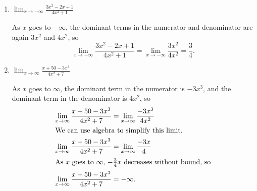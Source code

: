 \documentclass{article}
\begin{document}
\begin{enumerate}
\begin{enumerate}

    \begin{problem}[\vfill]
      $\displaystyle \lim_{x \to \infty} \frac{3x^2 - 2x + 1}{4x^2 + 1}$      
    \end{problem}

    \begin{solution}
      Using the idea of the previous part, we can identify that, as $x$ goes to $\infty$,
      the dominant term in the numerator is $3x^2$, 
      and the dominant term in the denominator is $4x^2$. This means that
      \begin{align*}
        \lim_{x \to \infty} \frac{3x^2-2x+1}{4x^2+1} &= \lim_{x \to \infty} \frac{3x^2}{4x^2}.\\
        \intertext{We can simplify this using algebra and evaluate the limit.}
        \lim_{x \to \infty} \frac{3x^2-2x+1}{4x^2+1} &= \frac{3}{4}
      \end{align*}
    \end{solution}

  \item

    \begin{problem}[\vfill]
      $\displaystyle \lim_{x \to -\infty} \frac{3x^2 - 2x + 1}{4x^2 + 1}$      
    \end{problem}

    \begin{solution}
      As $x$ goes to $-\infty$, the dominant terms in the numerator and denominator are again $3x^2$ and $4x^2$,
      so
      \[\lim_{x \to -\infty} \frac{3x^2-2x+1}{4x^2+1} = \lim_{x \to -\infty} \frac{3x^2}{4x^2}=\frac{3}{4}.\]
    \end{solution}

  \item
    \begin{problem}[\vfill]
      $\displaystyle \lim_{x \to \infty} \frac{x + 50 - 3x^3}{4x^2 + 7}$      
    \end{problem}

    \begin{solution}
      As $x$ goes to $\infty$, the dominant term in the numerator is $-3x^3$, and the dominant term in the
      denominator is $4x^2$, so
      \begin{align*}
        \lim_{x \to \infty} \frac{x + 50 - 3x^3}{4x^2 + 7} &= \lim_{x \to \infty} \frac{-3x^3}{4x^2} \\
        \intertext{We can use algebra to simplify this limit.}
        \lim_{x \to \infty} \frac{x + 50 - 3x^3}{4x^2 + 7} &= \lim_{x \to \infty} \frac{-3x}{4} \\
        \intertext{As $x$ goes to $\infty$, $-\frac{3}{4}x$ decreases without bound, so}
        \lim_{x \to \infty} \frac{x + 50 - 3x^3}{4x^2 + 7} &= -\infty.
      \end{align*}
    \end{solution}


\end{enumerate}
\end{enumerate}
\end{document}
